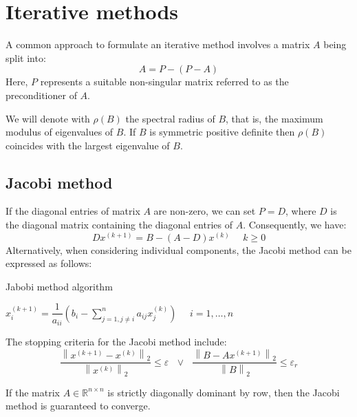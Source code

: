 \section{Iterative methods}

A common approach to formulate an iterative method involves a matrix $A$ being split into:
\[A=P-\left(P-A\right)\]
Here, $P$ represents a suitable non-singular matrix referred to as the preconditioner of $A$.

We will denote with $\rho(B)$ the spectral radius of $B$, that is, the maximum modulus of eigenvalues of $B$. 
If $B$ is symmetric positive definite then $\rho(B)$ coincides with the largest eigenvalue of $B$. 

\subsection*{Jacobi method}
If the diagonal entries of matrix $A$ are non-zero, we can set $P=D$, where $D$ is the diagonal matrix containing the diagonal entries of $A$. 
Consequently, we have:
\[Dx^{(k+1)}=B-\left(A-D\right)x^{(k)} \:\:\:\:\:\: k \geq 0\]
Alternatively, when considering individual components, the Jacobi method can be expressed as follows:
\begin{algorithm}[H]
    \caption{Jabobi method algorithm}
        \begin{algorithmic}[1]
            \State $x_i^{(k+1)}=\dfrac{1}{a_{ii}}\left( b_i-\sum_{j=1,j \neq i}^{n}a_{ij}x_j^{(k)}\right) \:\:\:\:\:\: i=1,\dots,n $
        \end{algorithmic}
\end{algorithm}
The stopping criteria for the Jacobi method include:
\[\dfrac{\left\lVert x^{(k+1)}-x^{(k)} \right\rVert_2}{\left\lVert x^{(k)} \right\rVert_2} \leq \varepsilon \:\:\: \lor \:\:\: \dfrac{\left\lVert B- Ax^{(k+1)} \right\rVert_2}{\left\lVert B \right\rVert_2} \leq \varepsilon_r\]
\begin{proposition}
    If the matrix $A \in \mathbb{R}^{n \times n}$ is strictly diagonally dominant by row, then the Jacobi method is guaranteed to converge.
\end{proposition}

